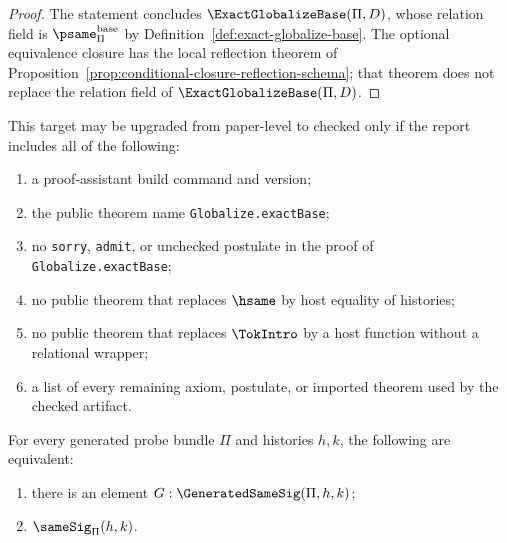\begin{proof}
The statement concludes \(\ExactGlobalizeBase(\Pi,D)\), whose relation field is \(\psame_{\Pi}^{\mathrm{base}}\) by Definition~\ref{def:exact-globalize-base}. The optional equivalence closure has the local reflection theorem of Proposition~\ref{prop:conditional-closure-reflection-schema}; that theorem does not replace the relation field of \(\ExactGlobalizeBase(\Pi,D)\).
\end{proof}

\begin{protocol}
\label{prot:checked-acceptance-gate}
This target may be upgraded from paper-level to checked only if the report includes all of the following:
\begin{enumerate}
  \item a proof-assistant build command and version;
  \item the public theorem name \texttt{Globalize.exactBase};
  \item no \texttt{sorry}, \texttt{admit}, or unchecked postulate in the proof of \texttt{Globalize.exactBase};
  \item no public theorem that replaces \(\hsame\) by host equality of histories;
  \item no public theorem that replaces \(\TokIntro\) by a host function without a relational wrapper;
  \item a list of every remaining axiom, postulate, or imported theorem used by the checked artifact.
\end{enumerate}
\end{protocol}

\begin{theorem}
\label{thm:generated-same-sig-inhabitation-iff-samesig}
For every generated probe bundle $\Pi$ and histories $h,k$, the following are equivalent:
\begin{enumerate}
  \item there is an element $G:\GeneratedSameSig(\Pi,h,k)$;
  \item $\sameSig_\Pi(h,k)$.
\end{enumerate}
\end{theorem}

